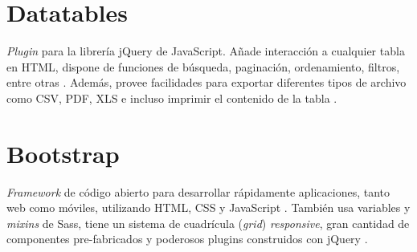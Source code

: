 \section{Datatables}

\textit{Plugin} para la librería jQuery de JavaScript. Añade interacción
a cualquier tabla en HTML, dispone de funciones de búsqueda, paginación,
ordenamiento, filtros, entre otras \cite{Datatables}. Además, provee facilidades para exportar diferentes tipos de archivo como CSV, PDF, XLS e incluso imprimir el contenido de la tabla \cite{Datatables}.

\section{Bootstrap}

\textit{Framework} de código abierto para desarrollar rápidamente
aplicaciones, tanto web como móviles, utilizando HTML, CSS y JavaScript \cite{Bootstrap}.
También usa variables y \textit{mixins} de Sass, tiene un sistema de cuadrícula
(\textit{grid}) \textit{responsive}, gran cantidad de componentes pre-fabricados y poderosos plugins construidos con jQuery \cite{Bootstrap}.
